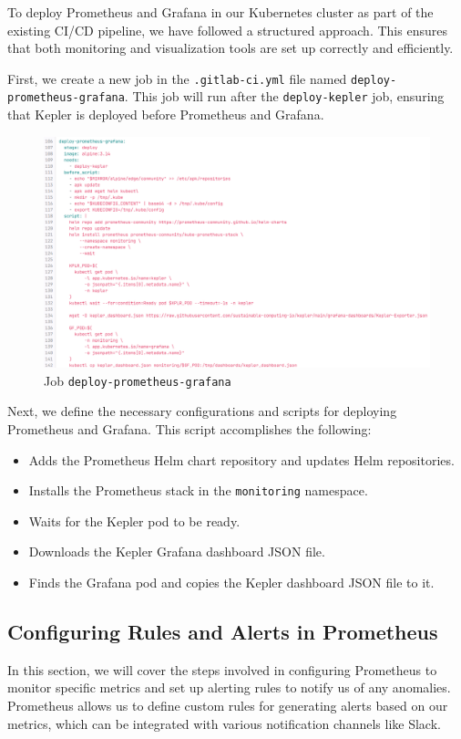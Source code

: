 To deploy Prometheus and Grafana in our Kubernetes cluster as part of the existing CI/CD pipeline, we have followed a structured approach. This ensures that both monitoring and visualization tools are set up correctly and efficiently.

First, we create a new job in the \texttt{.gitlab-ci.yml} file named \texttt{deploy-prometheus-grafana}. This job will run after the \texttt{deploy-kepler} job, ensuring that Kepler is deployed before Prometheus and Grafana.

\begin{figure}[H]
  \centering
  \includegraphics[width=16cm]{Figures/deploy-prometheus-grafana-job.png}
  \caption{Job \texttt{deploy-prometheus-grafana}}
\end{figure}

Next, we define the necessary configurations and scripts for deploying Prometheus and Grafana.
This script accomplishes the following:

\begin{itemize}
  \item Adds the Prometheus Helm chart repository and updates Helm repositories.
  \item Installs the Prometheus stack in the \texttt{monitoring} namespace.
  \item Waits for the Kepler pod to be ready.
  \item Downloads the Kepler Grafana dashboard JSON file.
  \item Finds the Grafana pod and copies the Kepler dashboard JSON file to it.
\end{itemize}

\subsection{Configuring Rules and Alerts in Prometheus}
In this section, we will cover the steps involved in configuring Prometheus to monitor specific metrics and set up alerting rules to notify us of any anomalies. Prometheus allows us to define custom rules for generating alerts based on our metrics, which can be integrated with various notification channels like Slack.

